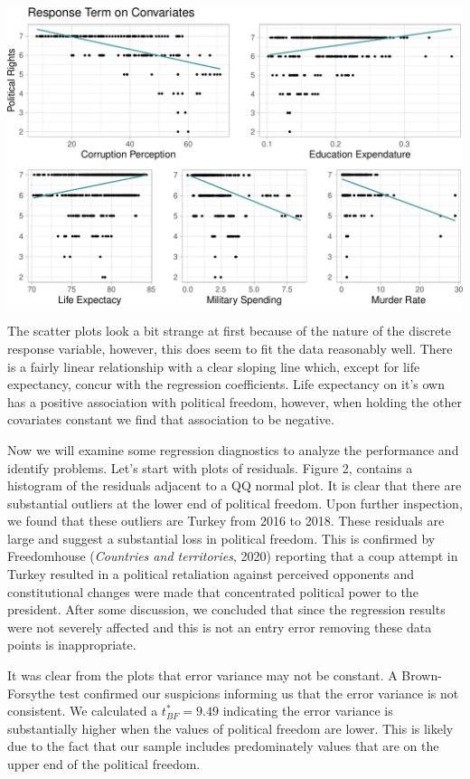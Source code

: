 \documentclass[
  english,
  man,floatsintext]{apa6}
\begin{document}
\includegraphics{paper_files/figure-latex/unnamed-chunk-5-1.pdf}

The scatter plots look a bit strange at first because of the nature of the discrete response variable, however, this does seem to fit the data reasonably well. There is a fairly linear relationship with a clear sloping line which, except for life expectancy, concur with the regression coefficients. Life expectancy on it's own has a positive association with political freedom, however, when holding the other covariates constant we find that association to be negative.

Now we will examine some regression diagnostics to analyze the performance and identify problems. Let's start with plots of residuals. Figure 2, contains a histogram of the residuals adjacent to a QQ normal plot. It is clear that there are substantial outliers at the lower end of political freedom. Upon further inspection, we found that these outliers are Turkey from 2016 to 2018. These residuals are large and suggest a substantial loss in political freedom. This is confirmed by Freedomhouse (\emph{Countries and territories}, 2020) reporting that a coup attempt in Turkey resulted in a political retaliation against perceived opponents and constitutional changes were made that concentrated political power to the president. After some discussion, we concluded that since the regression results were not severely affected and this is not an entry error removing these data points is inappropriate.

It was clear from the plots that error variance may not be constant. A Brown-Forsythe test confirmed our suspicions informing us that the error variance is not consistent. We calculated a \(t^{*}_{BF} = 9.49\) indicating the error variance is substantially higher when the values of political freedom are lower. This is likely due to the fact that our sample includes predominately values that are on the upper end of the political freedom.
\end{document}
